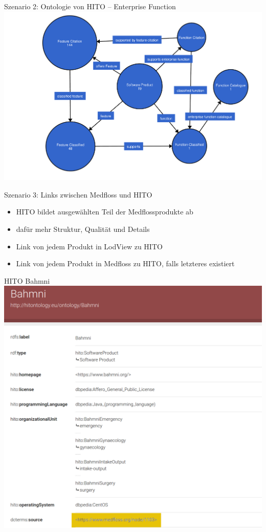 \documentclass[aspectratio=1610,12pt]{beamer}
\begin{document}
\begin{frame}{Szenario 2: Ontologie von HITO -- Enterprise Function}
\centering
\includegraphics[height=.8\textheight]{img/function.pdf}
\end{frame}


\begin{frame}{Szenario 3: Links zwischen Medfloss und HITO}
\begin{spacing}{1.5}
\begin{itemize}
\item HITO bildet ausgewählten Teil der Medflossprodukte ab
\item dafür mehr Struktur, Qualität und Details
\item Link von jedem Produkt in LodView zu HITO
\item Link von jedem Produkt in Medfloss zu HITO, falls letzteres existiert
\end{itemize}
\end{spacing}
\end{frame}

\begin{frame}{HITO Bahmni}
  \vspace{-0.5cm}
  \centering
  \includegraphics[height=.8\textheight]{img/hito-bahmni.png}
\end{frame}
\end{document}
